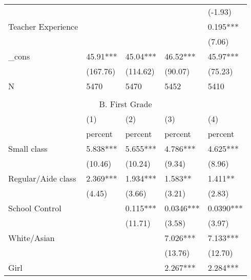 \documentclass{article}
\begin{document}
\begin{table}[htbp]
\begin{tabular}{lrllrr}
          &       &       &       & \multicolumn{1}{l}{} & \multicolumn{1}{l}{(-1.93)} \\
    \multicolumn{2}{l}{Teacher Experience} &       &       & \multicolumn{1}{l}{} & \multicolumn{1}{l}{0.195***} \\
          &       &       &       & \multicolumn{1}{l}{} & \multicolumn{1}{l}{(7.06)} \\
    \multicolumn{2}{l}{\_cons} & 45.91*** & 45.04*** & \multicolumn{1}{l}{46.52***} & \multicolumn{1}{l}{45.97***} \\
          &       & (167.76) & (114.62) & \multicolumn{1}{l}{(90.07)} & \multicolumn{1}{l}{(75.23)} \\
    \multicolumn{2}{l}{N} & 5470  & 5470  & \multicolumn{1}{l}{5452} & \multicolumn{1}{l}{5410} \\
          &       &       &       &       &  \\
    \multicolumn{6}{c}{B. First Grade} \\
    \midrule
          &       & (1)   & (2)   & \multicolumn{1}{l}{(3)} & \multicolumn{1}{l}{(4)} \\
    \midrule
          &       & percent & percent & \multicolumn{1}{l}{percent} & \multicolumn{1}{l}{percent} \\
    \multicolumn{2}{l}{Small class} & 5.838*** & 5.655*** & \multicolumn{1}{l}{4.786***} & \multicolumn{1}{l}{4.625***} \\
          &       & (10.46) & (10.24) & \multicolumn{1}{l}{(9.34)} & \multicolumn{1}{l}{(8.96)} \\
    \multicolumn{2}{l}{Regular/Aide class} & 2.369*** & 1.934*** & \multicolumn{1}{l}{1.583**} & \multicolumn{1}{l}{1.411**} \\
          &       & (4.45) & (3.66) & \multicolumn{1}{l}{(3.21)} & \multicolumn{1}{l}{(2.83)} \\
    \multicolumn{2}{l}{School Control} &       & 0.115*** & \multicolumn{1}{l}{0.0346***} & \multicolumn{1}{l}{0.0390***} \\
          &       &       & (11.71) & \multicolumn{1}{l}{(3.58)} & \multicolumn{1}{l}{(3.97)} \\
    \multicolumn{2}{l}{White/Asian} &       &       & \multicolumn{1}{l}{7.026***} & \multicolumn{1}{l}{7.133***} \\
          &       &       &       & \multicolumn{1}{l}{(13.76)} & \multicolumn{1}{l}{(12.70)} \\
    \multicolumn{2}{l}{Girl} &       &       & \multicolumn{1}{l}{2.267***} & \multicolumn{1}{l}{2.284***} \\

\end{tabular}
\end{table}
\end{document}
